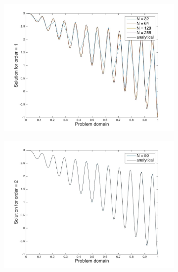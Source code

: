 \documentclass[10pt]{article}
\begin{document}
\begin{figure}[H]
\centering
\begin{subfigure}{.48\textwidth}
  \centering
  \includegraphics[width=1.0\linewidth]{Nplot_for_order_1.jpg}
  \caption{}
\end{subfigure}
\begin{subfigure}{.48\textwidth}
  \centering
  \includegraphics[width=1.0\linewidth]{Nplot_for_order_2.jpg}
  \caption{}
\end{subfigure}
\begin{subfigure}{.48\textwidth}
  \centering

\end{subfigure}
\end{figure}
\end{document}
